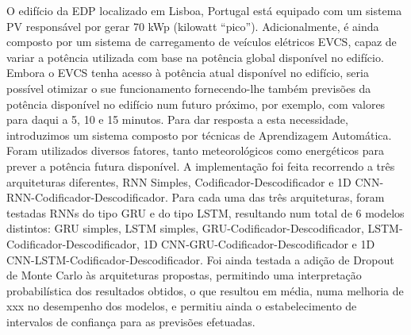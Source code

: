 \noindent O edifício da \ac{EDP} localizado em Lisboa, Portugal está equipado com um sistema \ac{PV} responsável por gerar 70 kWp (kilowatt “pico”). Adicionalmente, é ainda composto por um sistema de carregamento de veículos elétricos \ac{EVCS}, capaz de variar a potência utilizada com base na potência global disponível no edifício. Embora o \ac{EVCS} tenha acesso à potência atual disponível no edifício, seria possível otimizar o sue funcionamento fornecendo-lhe também previsões da potência disponível no edifício num futuro próximo, por exemplo, com valores para daqui a 5, 10 e 15 minutos. Para dar resposta a esta necessidade, introduzimos um sistema composto por técnicas de Aprendizagem Automática. Foram utilizados diversos fatores, tanto meteorológicos como energéticos para prever a potência futura disponível. A implementação foi feita recorrendo a três arquiteturas diferentes, \ac{RNN} Simples, Codificador-Descodificador e \ac{1D CNN}-\ac{RNN}-Codificador-Descodificador. Para cada uma das três arquiteturas, foram testadas \ac{RNN}s do tipo \ac{GRU} e do tipo \ac{LSTM}, resultando num total de 6 modelos distintos: \ac{GRU} simples, \ac{LSTM} simples, \ac{GRU}-Codificador-Descodificador, \ac{LSTM}-Codificador-Descodificador, \ac{1D CNN}-\ac{GRU}-Codificador-Descodificador e \ac{1D CNN}-\ac{LSTM}-Codificador-Descodificador. Foi ainda testada a adição de Dropout de Monte Carlo às arquiteturas propostas, permitindo uma interpretação probabilística dos resultados obtidos, o que resultou em média, numa melhoria de xxx no desempenho dos modelos, e permitiu ainda o estabelecimento de intervalos de confiança para as previsões efetuadas. 
